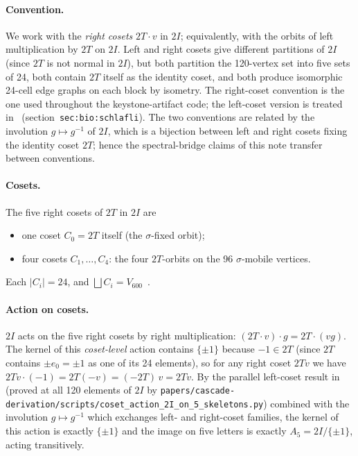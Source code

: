 \documentclass[11pt]{article}
\newcommand{\Vsix}{V_{600}}
\newcommand{\twoI}{2I}
\newcommand{\twoT}{2T}
\theoremstyle{plain}
\theoremstyle{definition}
\begin{document}
\paragraph{Convention.}
We work with the \emph{right cosets} $\twoT\!\cdot\! v$ in $\twoI$;
equivalently, with the orbits of left multiplication by $\twoT$ on
$\twoI$.  Left and right cosets give different partitions of $\twoI$
(since $\twoT$ is not normal in $\twoI$), but both partition the
120-vertex set into five sets of 24, both contain $\twoT$ itself as
the identity coset, and both produce isomorphic 24-cell edge graphs
on each block by isometry.  The right-coset convention is the one
used throughout the keystone-artifact code; the left-coset version
is treated in~\cite{SmartXXXV} (section~\texttt{sec:bio:schlafli}).
The two conventions are related by the involution $g\mapsto g^{-1}$
of $\twoI$, which is a bijection between left and right cosets
fixing the identity coset $\twoT$; hence the spectral-bridge claims
of this note transfer between conventions.

\paragraph{Cosets.}
The five right cosets of $\twoT$ in $\twoI$ are
\begin{itemize}
  \item one coset $C_0 = \twoT$ itself (the $\sigma$-fixed orbit);
  \item four cosets $C_1,\dots,C_4$: the four $\twoT$-orbits on the
        96 $\sigma$-mobile vertices.
\end{itemize}
Each $|C_i| = 24$, and $\bigsqcup C_i = \Vsix$~\cite{SmartXXXV,
Vsixprog}.

\paragraph{Action on cosets.}
$\twoI$ acts on the five right cosets by right multiplication:
$(\twoT\!\cdot\! v)\cdot g = \twoT\!\cdot\!(vg)$.  The kernel of this
\emph{coset-level} action contains $\{\pm1\}$ because $-1 \in \twoT$
(since $\twoT$ contains $\pm e_0 = \pm1$ as one of its 24 elements),
so for any right coset $\twoT v$ we have $\twoT v\cdot(-1) =
\twoT(-v) = (-\twoT)\,v = \twoT v$.  By the parallel left-coset
result in~\cite{SmartXXXV} (proved at all 120 elements of $\twoI$ by
\texttt{papers/cascade-derivation/scripts/coset\_action\_2I\_on\_5\_skeletons.py})
combined with the involution $g \mapsto g^{-1}$ which exchanges
left- and right-coset families, the kernel of this action is exactly
$\{\pm 1\}$ and the image on five letters is exactly
$A_5 = \twoI/\{\pm 1\}$, acting transitively.
\end{document}
